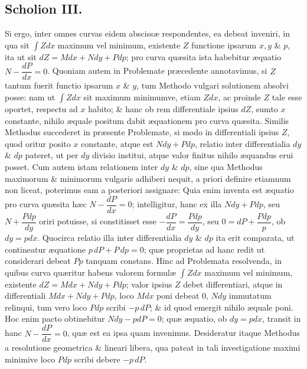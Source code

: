 \subsection*{Scholion III.}
Si ergo, inter omnes curvas eidem abscissæ respondentes, ea debeat inveniri, in qua sit $\int Zdx$ maximum vel minimum, existente $Z$ functione ipsarum $x,y$ \& $p$, ita ut sit $dZ=Mdx+Ndy+Pdp$; pro curva quæsita ista habebitur æquatio $N-\dfrac{dP}{dx}=0$. Quoniam autem in Problemate præcedente annotavimus, si $Z$ tantum fuerit functio ipsarum $x$ \& $y$, tum Methodo vulgari solutionem absolvi posse: nam ut $\int Zdx$ sit maximum minimumve, etiam $Zdx$, ac proinde $Z$ tale esse oportet, respectu ad $x$ habito; \& hanc ob rem differentiale ipsius $dZ$, sumto $x$ constante, nihilo æquale positum dabit æquationem pro curva quæsita. Similis Methodus succederet in præsente Problemate, si modo in differentiali ipsius $Z$, quod oritur posito $x$ constante, atque est $Ndy+Pdp$, relatio inter differentialia $dy$ \& $dp$ pateret, ut per $dy$ divisio institui, atque valor finitus nihilo æquandus erui posset. Cum autem istam relationem inter $dy$ \& $dp$, sine qua Methodus maximorum \& minimorum vulgaris adhiberi nequit, a priori definire etiamnum non liceat, poterimus eam a posteriori assignare: Quia enim inventa est æquatio pro curva quæsita hæc $N-\dfrac{dP}{dx}=0$; intelligitur, hanc ex illa $Ndy+Pdp$, seu $N+\dfrac{Pdp}{dy}$ oriri potuisse, si constitisset esse $-\dfrac{dP}{dx}=\dfrac{Pdp}{dy}$, seu $0=dP+\dfrac{Pdp}{p}$, ob $dy=pdx$. Quocirca relatio illa inter differentialia $dy$ \& $dp$ ita erit comparata, ut contineatur æquatione $p\,dP+P\,dp=0$; quæ proprietas ad hanc redit ut considerari debeat $Pp$ tanquam constans. Hinc ad Problemata resolvenda, in quibus curva quæritur habens valorem formulæ $\int Zdx$ maximum vel minimum, existente $dZ=Mdx+Ndy+Pdp$; valor ipsius $Z$ debet differentiari, atque in differentiali $Mdx+Ndy+Pdp$, loco $Mdx$ poni debeat $0$, $Ndy$ immutatum relinqui, tum vero loco $Pdp$ scribi $-p\,dP$; \& id quod emergit nihilo æquale poni. Hoc enim pacto obtinebitur $Ndy-pdP=0$; quæ æquatio, ob $dy=pdx$, transit in hanc $N-\dfrac{dP}{dx}=0$, quæ est ea ipsa quam invenimus. Desideratur itaque Methodus a resolutione geometrica \& lineari libera, qua pateat in tali investigatione maximi minimive loco $Pdp$ scribi debere $-p\,dP$.
